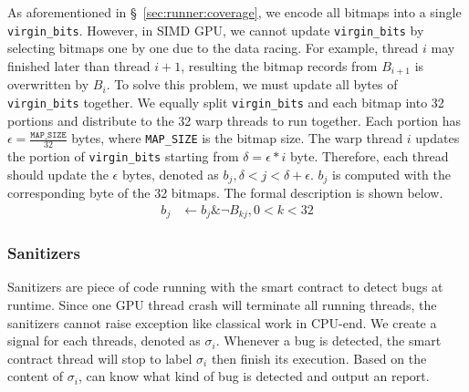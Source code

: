 As aforementioned in \S~\ref{sec:runner:coverage}, we encode all bitmaps into a single \texttt{virgin\_bits}. 
However, in SIMD GPU, we cannot update \texttt{virgin\_bits} by selecting bitmaps one by one due to the data racing. 
For example, thread $i$ may finished later than thread $i+1$, resulting the bitmap records from $B_{i+1}$ is overwritten by $B_i$.
%
To solve this problem, we must update all bytes of \texttt{virgin\_bits} together.
We equally split \texttt{virgin\_bits} and each bitmap into 32 portions and distribute to the 32 warp threads to run together. 
Each portion has $\epsilon = \frac{\texttt{MAP\_SIZE}}{32}$ bytes, where \texttt{MAP\_SIZE} is the bitmap size. 
The warp thread $i$ updates the portion of \texttt{virgin\_bits} starting from $\delta = \epsilon * i$ byte. 
Therefore, each thread should update the $\epsilon$ bytes, denoted as $b_{j}, \delta < j < \delta + \epsilon$.
$b_j$ is computed with the corresponding byte of the 32 bitmaps. 
The formal description is shown below.
$$
\begin{aligned}
b_j &\gets b_j \& \neg B_{kj}, 0 < k < 32
\end{aligned}
$$


\subsubsection{Sanitizers}
Sanitizers are piece of code running with the smart contract to detect bugs at runtime. 
Since one GPU thread crash will terminate all running threads, the sanitizers cannot raise exception like classical work in CPU-end. 
%
We create a signal for each threads, denoted as $\sigma_i$. 
%
Whenever a bug is detected, the smart contract thread will stop to label $\sigma_i$ then finish its execution. 
Based on the content of $\sigma_i$, {\runner} can know what kind of bug is detected and output an report. 